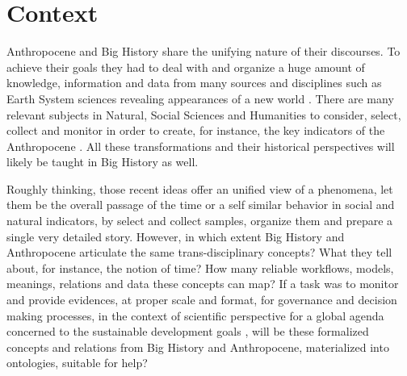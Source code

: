 \documentclass[
	12pt, %
	a4paper, %
	oneside, %
	headinclude, footinclude, %
	BCOR5mm, %
]{scrartcl}
\begin{document}
{\let\thefootnote\relax{}}

{\let\thefootnote\relax{}}

\newpage

\section{Context}

Anthropocene \citep{crutzen_anthropocene_2000, crutzen_geology_2002} and Big History \citep{christian_maps_2004} share the unifying nature of their discourses. To achieve their goals they had to deal with and organize a huge amount of knowledge, information and data from many sources and disciplines such as Earth System sciences \citep{jacobson_earth_2000} revealing appearances of a new world \citep{zalasiewicz_new_2010}. There are many relevant subjects in Natural, Social Sciences and Humanities to consider, select, collect and monitor in order to create, for instance, the key indicators of the Anthropocene \citep{steffen_anthropocene:_2011}. All these transformations and their historical perspectives will likely be taught in Big History as well.

Roughly thinking, those recent ideas offer an unified view of a phenomena, let them be the overall passage of the time or a self similar behavior in social and natural indicators, by select and collect samples, organize them and prepare a single very detailed story. However, in which extent Big History and Anthropocene articulate the same trans-disciplinary concepts? What they tell about, for instance, the notion of time? How many reliable workflows, models, meanings, relations and data these concepts can map? If a task was to monitor and provide evidences, at proper scale and format, for governance and decision making processes, in the context of \citet{icsu-issc_review_2015} scientific perspective for a global agenda concerned to the sustainable development goals \citep{united_nations_transforming_2015}, will be these formalized concepts and relations from Big History and Anthropocene, materialized into ontologies, suitable for help?
\end{document}
